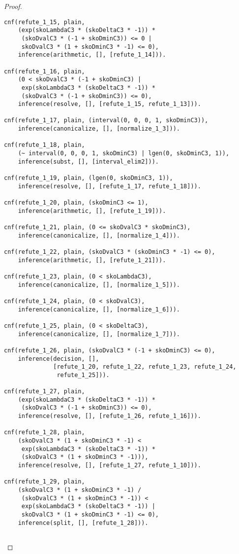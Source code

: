\begin{proof}
\begin{verbatim}
cnf(refute_1_15, plain,
    (exp(skoLambdaC3 * (skoDeltaC3 * -1)) *
     (skoDvalC3 * (-1 + skoDminC3)) <= 0 |
     skoDvalC3 * (1 + skoDminC3 * -1) <= 0),
    inference(arithmetic, [], [refute_1_14])).

cnf(refute_1_16, plain,
    (0 < skoDvalC3 * (-1 + skoDminC3) |
     exp(skoLambdaC3 * (skoDeltaC3 * -1)) *
     (skoDvalC3 * (-1 + skoDminC3)) <= 0),
    inference(resolve, [], [refute_1_15, refute_1_13])).

cnf(refute_1_17, plain, (interval(0, 0, 0, 1, skoDminC3)),
    inference(canonicalize, [], [normalize_1_3])).

cnf(refute_1_18, plain,
    (~ interval(0, 0, 0, 1, skoDminC3) | lgen(0, skoDminC3, 1)),
    inference(subst, [], [interval_elim2])).

cnf(refute_1_19, plain, (lgen(0, skoDminC3, 1)),
    inference(resolve, [], [refute_1_17, refute_1_18])).

cnf(refute_1_20, plain, (skoDminC3 <= 1),
    inference(arithmetic, [], [refute_1_19])).

cnf(refute_1_21, plain, (0 <= skoDvalC3 * skoDminC3),
    inference(canonicalize, [], [normalize_1_4])).

cnf(refute_1_22, plain, (skoDvalC3 * (skoDminC3 * -1) <= 0),
    inference(arithmetic, [], [refute_1_21])).

cnf(refute_1_23, plain, (0 < skoLambdaC3),
    inference(canonicalize, [], [normalize_1_5])).

cnf(refute_1_24, plain, (0 < skoDvalC3),
    inference(canonicalize, [], [normalize_1_6])).

cnf(refute_1_25, plain, (0 < skoDeltaC3),
    inference(canonicalize, [], [normalize_1_7])).

cnf(refute_1_26, plain, (skoDvalC3 * (-1 + skoDminC3) <= 0),
    inference(decision, [],
              [refute_1_20, refute_1_22, refute_1_23, refute_1_24,
               refute_1_25])).

cnf(refute_1_27, plain,
    (exp(skoLambdaC3 * (skoDeltaC3 * -1)) *
     (skoDvalC3 * (-1 + skoDminC3)) <= 0),
    inference(resolve, [], [refute_1_26, refute_1_16])).

cnf(refute_1_28, plain,
    (skoDvalC3 * (1 + skoDminC3 * -1) <
     exp(skoLambdaC3 * (skoDeltaC3 * -1)) *
     (skoDvalC3 * (1 + skoDminC3 * -1))),
    inference(resolve, [], [refute_1_27, refute_1_10])).

cnf(refute_1_29, plain,
    (skoDvalC3 * (1 + skoDminC3 * -1) /
     (skoDvalC3 * (1 + skoDminC3 * -1)) <
     exp(skoLambdaC3 * (skoDeltaC3 * -1)) |
     skoDvalC3 * (1 + skoDminC3 * -1) <= 0),
    inference(split, [], [refute_1_28])).


\end{verbatim}
\end{proof}
